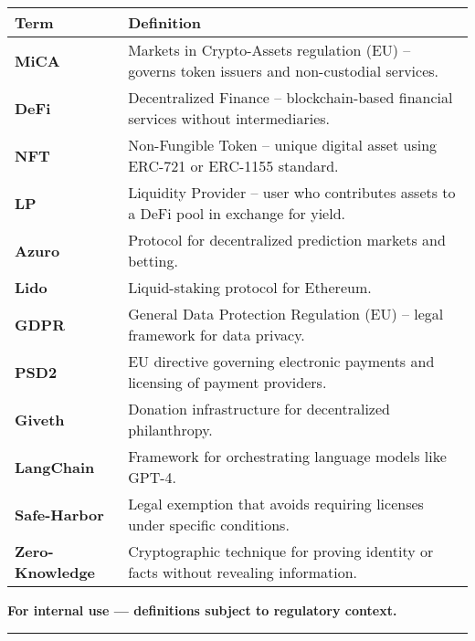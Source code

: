 \documentclass[13pt]{extarticle}
\begin{document}
\vspace{2cm}
\renewcommand{\arraystretch}{1.6}
\begin{center}
\begin{tabular}{>{\bfseries}p{4.8cm} p{9.2cm}}
  \toprule
  \textbf{Term} & \textbf{Definition} \\
  \midrule

  MiCA & Markets in Crypto-Assets regulation (EU) – governs token issuers and non-custodial services. \\

  DeFi & Decentralized Finance – blockchain-based financial services without intermediaries. \\

  NFT & Non-Fungible Token – unique digital asset using ERC-721 or ERC-1155 standard. \\

  LP & Liquidity Provider – user who contributes assets to a DeFi pool in exchange for yield. \\

  Azuro & Protocol for decentralized prediction markets and betting. \\

  Lido & Liquid-staking protocol for Ethereum. \\

  GDPR & General Data Protection Regulation (EU) – legal framework for data privacy. \\

  PSD2 & EU directive governing electronic payments and licensing of payment providers. \\

  Giveth & Donation infrastructure for decentralized philanthropy. \\

  LangChain & Framework for orchestrating language models like GPT-4. \\

  Safe-Harbor & Legal exemption that avoids requiring licenses under specific conditions. \\

  Zero-Knowledge & Cryptographic technique for proving identity or facts without revealing information. \\

  \bottomrule
\end{tabular}
\end{center}

\vfill
\vspace{-1cm} %
{\centering\small\textbf{For internal use — definitions subject to regulatory context.}\par}
\vspace{0.3cm}
{\centering\color{black} \rule{0.5\textwidth}{0.6pt}\par}
\end{document}
